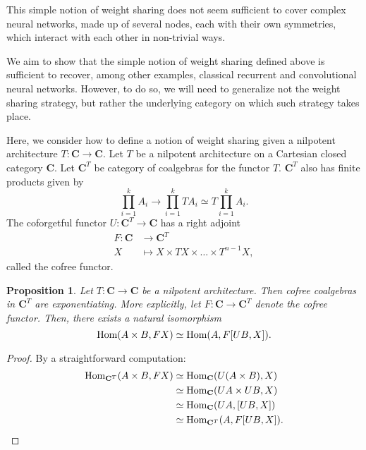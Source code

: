\documentclass[12pt]{article}
\newtheorem{proposition}{Proposition}
\newcommand{\Hom}{{\textnormal{Hom}}}
\newcommand{\Cat}{{\mathbf{C}}}
\begin{document}
This simple notion of weight sharing does not seem sufficient to cover complex neural networks, made up of several nodes, each with their own symmetries, which interact with each other in non-trivial ways.

We aim to show that the simple notion of weight sharing defined above is sufficient to recover, among other examples, classical recurrent and convolutional neural networks. However, to do so, we will need to generalize not the weight sharing strategy, but rather the underlying category on which such strategy takes place.

Here, we consider how to define a notion of weight sharing given a nilpotent architecture $T\colon\Cat \rightarrow \Cat$. Let $T$ be a nilpotent architecture on a Cartesian closed category $\Cat$. Let $\Cat^T$ be category of coalgebras for the functor $T$. $\Cat^T$ also has finite products given by
\begin{equation*}
    \prod_{i=1}^k A_i \rightarrow \prod_{i=1}^k T A_i \simeq T \prod_{i=1}^k A_i.
\end{equation*}
The coforgetful functor $U\colon \Cat^T \rightarrow \Cat$ has a right adjoint
\begin{align*}
    F \colon \Cat &\rightarrow \Cat^T\\
    X &\mapsto X \times T X \times \dots \times T^{n-1} X,
\end{align*}
called the cofree functor. 

\begin{proposition}\label{prop:cofree_exponentiating}
    Let $T\colon \Cat \rightarrow \Cat$ be a nilpotent architecture. Then cofree coalgebras in $\Cat^T$ are exponentiating. More explicitly, let $F\colon \Cat \rightarrow \Cat^T$ denote the cofree functor. Then, there exists a natural isomorphism
    \begin{equation*}
        \Hom(A\times B, FX) \simeq \Hom(A, F[UB, X]).
    \end{equation*}
\end{proposition}

\begin{proof}
    By a straightforward computation:
    \begin{align*}
        \Hom_{\Cat^T}(A\times B, FX)
        &\simeq \Hom_{\Cat}(U(A \times B), X)\\
        &\simeq \Hom_{\Cat}(UA \times UB, X)\\
        &\simeq \Hom_{\Cat}(UA, [UB, X])\\
        &\simeq \Hom_{\Cat^T}(A, F[UB, X]).
    \end{align*}
\end{proof}
\end{document}

